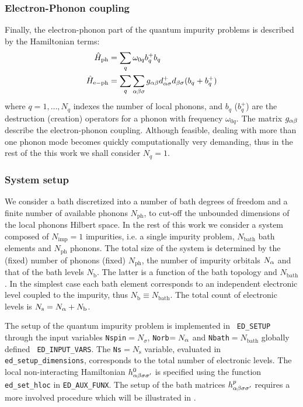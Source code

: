 \documentclass[edipack2.tex]{subfiles}
\begin{document}
\subsubsection{Electron-Phonon coupling}
Finally, the electron-phonon part of the quantum impurity problems is
described by the Hamiltonian terms: 
\begin{equation}\label{Hph}
  \begin{split}
    \hat{H}_\mathrm{ph}&=\sum_q \omega_{0q} b_q^+b_q\\
    \hat{H}_\mathrm{e-ph} &= \sum_q\sum_{\alpha\beta\sigma} g_{\alpha\beta} d^+_{\alpha\sigma}d_{\beta\sigma}(b_q+b_q^+)
\end{split}
\end{equation}
where $q=1,\dots,N_q$ indexes the number of local phonons, and $b_q$
($b_q^+$) are the destruction (creation) operators for a phonon with
frequency $\omega_{0q}$.
The matrix  $g_{\alpha\beta}$ describe the electron-phonon coupling. 
Although feasible, dealing with more than one phonon mode becomes
quickly computationally very demanding, thus in the rest of the this
work we shall consider $N_q=1$. 

\subsubsection{System setup}
We consider a bath discretized into a  number
of bath degrees of freedom and a finite number of available phonons $N_\mathrm{ph}$,
to cut-off the unbounded dimensions of the local phonons Hilbert
space.
In the rest of this work we consider a system composed of $N_\mathrm{imp}=1$
impurities, i.e. a single impurity problem, $N_\mathrm{bath}$ bath elements
and $N_\mathrm{ph}$ phonons.
The total size of the system is determined by the (fixed)
number of phonons (fixed) $N_\mathrm{ph}$, the number of impurity orbitals 
$N_\alpha$ and that of the bath levels  $N_\mathrm{b}$. The latter is a
function of  the bath topology and $N_\mathrm{bath}$.
In the simplest case each bath
element corresponds to an independent electronic level coupled to the
impurity, thus $N_\mathrm{b}\equiv N_\mathrm{bath}$.
The total count of electronic levels is  $N_\mathrm{s}=N_\alpha +
N_\mathrm{b}$. 


The setup of the quantum impurity problem is implemented in {\tt
  ED\_SETUP} through the input variables {\tt Nspin}$=N_\sigma$,
{\tt Norb}$=N_\alpha$ and {\tt Nbath}$=N_\mathrm{bath}$ globally defined {\tt
  ED\_INPUT\_VARS}. The {\tt Ns}$=N_\mathrm{s}$ variable, evaluated in
{\tt ed\_setup\_dimensions}, corresponds to the total number of
electronic levels. 
The local non-interacting Hamiltonian
$h^0_{\alpha\beta\sigma\sigma'}$ is specified using the function {\tt ed\_set\_hloc} in {\tt ED\_AUX\_FUNX}.
The setup of the bath matrices $h^p_{\alpha\beta\sigma\sigma'}$
requires a more involved procedure which will be illustrated in
. 
\end{document}

